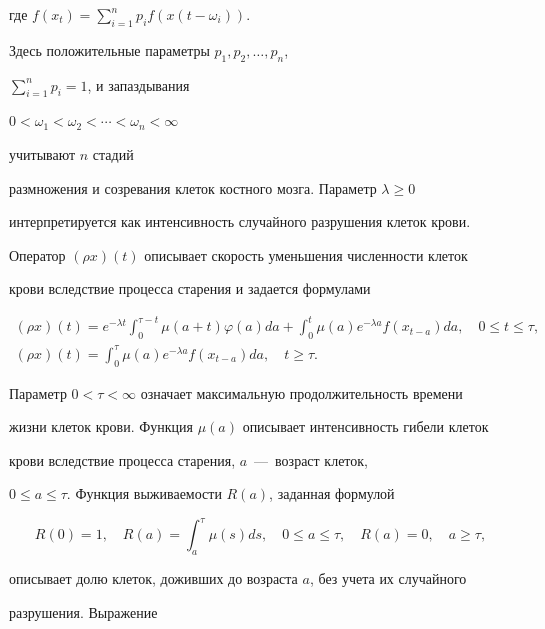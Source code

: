 где $f(x_{t})=\sum\limits_{i=1}^{n} p_{i} f(x(t-\omega_{i}))$.


Здесь положительные параметры $p_{1}, p_{2},\dotsc,p_{n}$,


$\sum\limits_{i=1}^{n} p_{i}=1$, и запаздывания


$0 < \omega_{1} < \omega_{2} <\dotsb < \omega_{n} < \infty$


учитывают $n$ стадий


размножения и созревания клеток костного мозга. Параметр $\lambda \geq 0$


интерпретируется как интенсивность случайного разрушения клеток крови.


Оператор $(\rho x) (t)$ описывает скорость уменьшения численности клеток


крови вследствие процесса старения и задается формулами


\begin{gather*}


(\rho x) (t)=e^{- \lambda t} \int_{0}^{\tau - t} \mu(a+t) \varphi(a) da+


\int_{0}^{t} \mu(a)


e^{- \lambda a} f(x_{t - a}) da, \quad 0  \leq t \leq \tau, \\


(\rho x) (t)=\int_{0}^{ \tau}


\mu(a) e^{- \lambda a} f(x_{t - a}) da, \quad t \geq \tau.


\end{gather*}


Параметр $0 < \tau < \infty$ означает максимальную продолжительность времени


жизни клеток крови. Функция $\mu(a)$ описывает интенсивность гибели клеток


крови вследствие процесса старения, $a$~---~возраст клеток,


$0 \leq a \leq \tau$. Функция выживаемости $R(a)$, заданная формулой


\begin{equation}


R(0)=1, \quad R(a)=\int_{a}^{\tau} \mu(s) ds, \quad 0 \leq a \leq \tau,


\quad R(a)=0, \quad a \geq \tau,


\end{equation}


описывает долю клеток, доживших до возраста $a$, без учета их случайного


разрушения. Выражение


